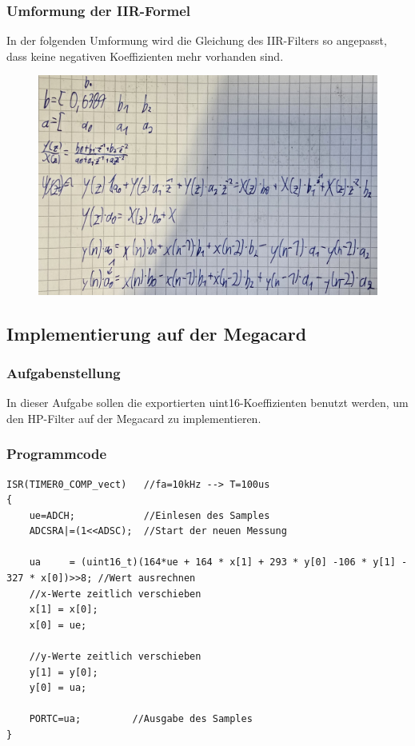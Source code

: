 \documentclass{article}
\begin{document}
\subsubsection{Umformung der IIR-Formel}
In der folgenden Umformung wird die Gleichung des IIR-Filters so angepasst, dass keine negativen Koeffizienten mehr vorhanden sind.
\begin{figure}[h]
    \centering
    \includegraphics[width=0.8\linewidth]{img/Formel_01.jpg}
\end{figure}
\newpage
\subsection{Implementierung auf der Megacard}
\subsubsection{Aufgabenstellung}
In dieser Aufgabe sollen die exportierten uint16-Koeffizienten benutzt werden, um den HP-Filter auf der Megacard zu implementieren.

\subsubsection{Programmcode}
\begin{verbatim}
ISR(TIMER0_COMP_vect)   //fa=10kHz --> T=100us
{ 
    ue=ADCH;			//Einlesen des Samples
    ADCSRA|=(1<<ADSC);  //Start der neuen Messung
 
    ua     = (uint16_t)(164*ue + 164 * x[1] + 293 * y[0] -106 * y[1] - 327 * x[0])>>8; //Wert ausrechnen
    //x-Werte zeitlich verschieben
    x[1] = x[0];
    x[0] = ue;

    //y-Werte zeitlich verschieben
    y[1] = y[0];
    y[0] = ua;

    PORTC=ua;         //Ausgabe des Samples
}
\end{verbatim}
\end{document}
